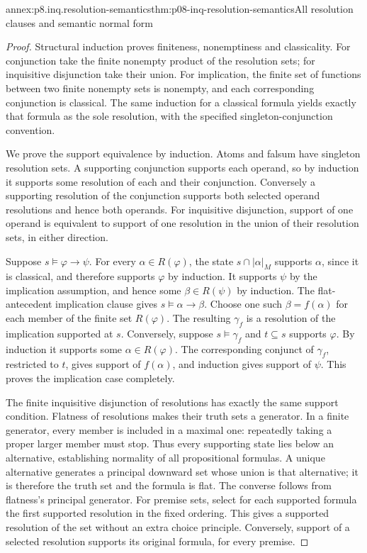 \begin{annexitem}{annex:p8.inq.resolution-semantics}{thm:p08-inq-resolution-semantics}{All resolution clauses and semantic normal form}
\begin{proof}
Structural induction proves finiteness, nonemptiness and classicality.
For conjunction take the finite nonempty product of the resolution sets;
for inquisitive disjunction take their union. For implication, the finite
set of functions between two finite nonempty sets is nonempty, and each
corresponding conjunction is classical. The same induction for a classical
formula yields exactly that formula as the sole resolution, with the
specified singleton-conjunction convention.

We prove the support equivalence by induction. Atoms and falsum have
singleton resolution sets. A supporting conjunction supports each operand,
so by induction it supports some resolution of each and their conjunction.
Conversely a supporting resolution of the conjunction supports both selected
operand resolutions and hence both operands. For inquisitive disjunction,
support of one operand is equivalent to support of one resolution in the
union of their resolution sets, in either direction.

Suppose \(s\models\varphi\to\psi\). For every \(\alpha\in R(\varphi)\),
the state \(s\cap|\alpha|_M\) supports \(\alpha\), since it is classical,
and therefore supports \(\varphi\) by induction. It supports \(\psi\)
by the implication assumption, and hence some \(\beta\in R(\psi)\)
by induction. The flat-antecedent implication clause gives
\(s\models\alpha\to\beta\). Choose one such \(\beta=f(\alpha)\)
for each member of the finite set \(R(\varphi)\). The resulting
\(\gamma_f\) is a resolution of the implication supported at \(s\).
Conversely, suppose \(s\models\gamma_f\) and \(t\subseteq s\) supports
\(\varphi\). By induction it supports some \(\alpha\in R(\varphi)\).
The corresponding conjunct of \(\gamma_f\), restricted to \(t\), gives
support of \(f(\alpha)\), and induction gives support of \(\psi\).
This proves the implication case completely.

The finite inquisitive disjunction of resolutions has exactly the same
support condition. Flatness of resolutions makes their truth sets a
generator. In a finite generator, every member is included in a maximal
one: repeatedly taking a proper larger member must stop. Thus every
supporting state lies below an alternative, establishing normality of all
propositional formulas. A unique alternative generates a principal downward
set whose union is that alternative; it is therefore the truth set and
the formula is flat. The converse follows from flatness's principal
generator. For premise sets, select for each supported formula the first
supported resolution in the fixed ordering. This gives a supported
resolution of the set without an extra choice principle. Conversely,
support of a selected resolution supports its original formula, for
every premise.
\end{proof}
\end{annexitem}

